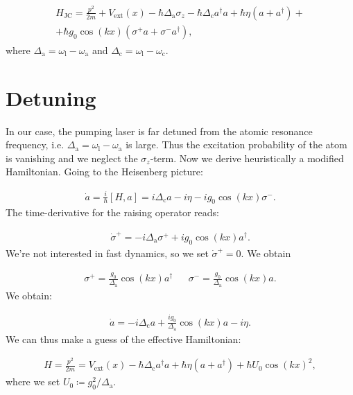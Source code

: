 \begin{align}
\begin{split}
H_\text{JC} = \frac{p^2}{2m} + V_\text{ext}(x) - \hbar \Delta_\text{a} \sigma_z - \hbar \Delta_\text{c} a^\dagger a + \hbar \eta (a + a^\dagger) + \\
+ \hbar g_0 \cos(kx) (\sigma^+ a + \sigma^- a^\dagger),
\end{split}
\end{align}where $\Delta_\text{a} = \omega_\text{l} - \omega_\text{a}$ and $\Delta_\text{c} = \omega_\text{l} - \omega_\text{c}$.

\section{Detuning}
In our case, the pumping laser is far detuned from the atomic resonance frequency, i.e. $\Delta_\text{a} = \omega_\text{l} - \omega_\text{a}$ is large. Thus the excitation probability of the atom is vanishing and we neglect the $\sigma_z$-term. Now we derive heuristically a modified Hamiltonian. Going to the Heisenberg picture:

\begin{align}
\dot{a} = \frac{i}{\hbar} [H, a] = i \Delta_\text{c} a - i \eta -i g_0 \cos(kx) \sigma^-.
\end{align}The time-derivative for the raising operator reads:

\begin{align}
\dot{\sigma}^+ = -i \Delta_\text{a} \sigma^+ + i g_0 \cos(kx) a^\dagger.
\end{align}We're not interested in fast dynamics, so we set $\dot{\sigma}^+ = 0$. We obtain

\begin{align}
\sigma^+ = \frac{g_0 }{\Delta_\text{a}} \cos(kx) a^\dagger && \sigma^- = \frac{g_0 }{\Delta_\text{a}} \cos(kx) a.
\end{align}We obtain:

\begin{align}
\dot{a} = -i \Delta_\text{c} a + \frac{i g_0}{\Delta_\text{a}}  \cos(kx) a - i \eta.
\end{align}We can thus make a guess of the effective Hamiltonian:

\begin{align}
H = \frac{p^2}{2m} = V_\text{ext}(x) - \hbar \Delta_\text{c} a^\dagger a + \hbar \eta (a + a^\dagger) + \hbar U_0 \cos(kx)^2,
\end{align}where we set $U_0 \coloneqq g_0^2 / \Delta_\text{a}$.

